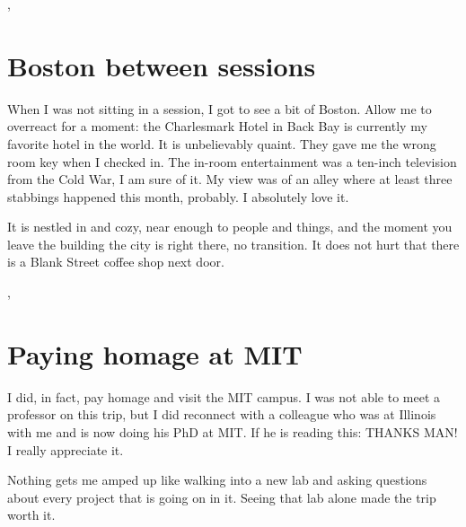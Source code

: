 
\sep

\section{Boston between sessions}

When I was not sitting in a session, I got to see a bit of Boston. Allow me
to overreact for a moment: the Charlesmark Hotel in Back Bay is currently my
favorite hotel in the world. It is unbelievably quaint. They gave me the
wrong room key when I checked in. The in-room entertainment was a ten-inch
television from the Cold War, I am sure of it. My view was of an alley where
at least three stabbings happened this month, probably. I absolutely love
it.


It is nestled in and cozy, near enough to people and things, and the moment
you leave the building the city is right there, no transition. It does not
hurt that there is a Blank Street coffee shop next door.



\sep

\section{Paying homage at MIT}

I did, in fact, pay homage and visit the MIT campus. I was not able to meet a
professor on this trip, but I did reconnect with a colleague who was at
Illinois with me and is now doing his PhD at MIT. If he is reading this:
THANKS MAN! I really appreciate it.


Nothing gets me amped up like walking into a new lab and asking questions
about every project that is going on in it. Seeing that lab alone made the
trip worth it.


